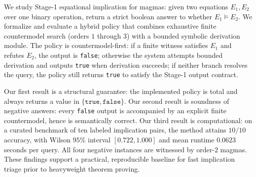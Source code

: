 We study Stage-1 equational implication for magmas: given two equations $E_1,E_2$ over one binary operation, return a strict boolean answer to whether $E_1 \models E_2$. We formalize and evaluate a hybrid policy that combines exhaustive finite countermodel search (orders $1$ through $3$) with a bounded symbolic derivation module. The policy is countermodel-first: if a finite witness satisfies $E_1$ and refutes $E_2$, the output is \texttt{false}; otherwise the system attempts bounded derivation and outputs \texttt{true} when derivation succeeds; if neither branch resolves the query, the policy still returns \texttt{true} to satisfy the Stage-1 output contract.

Our first result is a structural guarantee: the implemented policy is total and always returns a value in $\{\texttt{true},\texttt{false}\}$. Our second result is soundness of negative answers: every \texttt{false} output is accompanied by an explicit finite countermodel, hence is semantically correct. Our third result is computational: on a curated benchmark of ten labeled implication pairs, the method attains $10/10$ accuracy, with Wilson $95\%$ interval $[0.722,1.000]$ and mean runtime $0.0623$ seconds per query. All four negative instances are witnessed by order-$2$ magmas. These findings support a practical, reproducible baseline for fast implication triage prior to heavyweight theorem proving.
